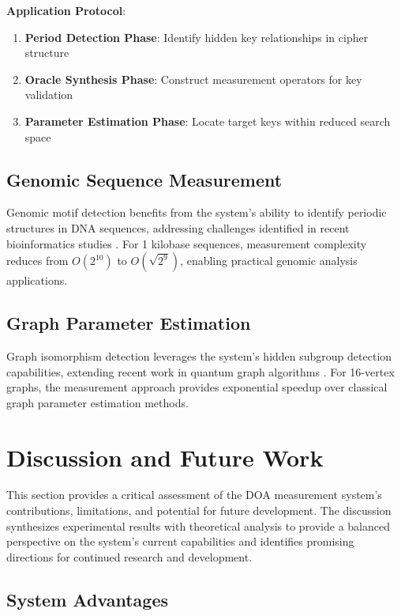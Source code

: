 \documentclass[journal]{IEEEtran}
\begin{document}
\textbf{Application Protocol}:
\begin{enumerate}
\item \textbf{Period Detection Phase}: Identify hidden key relationships in cipher structure
\item \textbf{Oracle Synthesis Phase}: Construct measurement operators for key validation
\item \textbf{Parameter Estimation Phase}: Locate target keys within reduced search space
\end{enumerate}

\subsection{Genomic Sequence Measurement}

Genomic motif detection benefits from the system's ability to identify periodic structures in DNA sequences, addressing challenges identified in recent bioinformatics studies \cite{singh2024independentimplementationquantummachine, yuan2024quantumcomputingdatabasesoverview}. For 1 kilobase sequences, measurement complexity reduces from $O(2^{10})$ to $O(\sqrt{2^9})$, enabling practical genomic analysis applications.

\subsection{Graph Parameter Estimation}

Graph isomorphism detection leverages the system's hidden subgroup detection capabilities, extending recent work in quantum graph algorithms \cite{li2019quantumalgorithmgraphisomorphism, Zanger_2021}. For 16-vertex graphs, the measurement approach provides exponential speedup over classical graph parameter estimation methods.


\section{Discussion and Future Work}

This section provides a critical assessment of the DOA measurement system's contributions, limitations, and potential for future development. The discussion synthesizes experimental results with theoretical analysis to provide a balanced perspective on the system's current capabilities and identifies promising directions for continued research and development.


\subsection{System Advantages}
\end{document}
